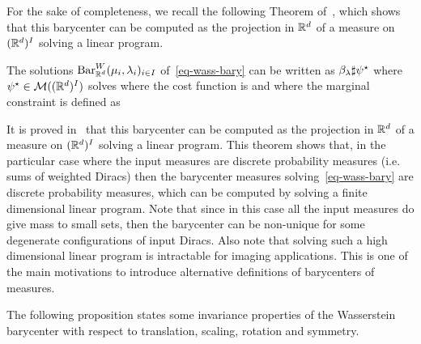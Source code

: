 
For the sake of completeness, we recall the following Theorem of~\cite{Carlier_wasserstein_barycenter}, which shows that this barycenter can be computed as the projection in $\mathbb{R}^d$ of a measure on $(\mathbb{R}^d)^I$ solving a linear program. 


\begin{thm}\label{thm-multimarginal-wass}
	The solutions $\text{\upshape Bar}_{\mathbb{R}^d}^W(\mu_i,\lambda_i)_{i \in I}$ of~\eqref{eq-wass-bary} can be written as $\beta_\lambda \sharp \psi^\star$ 
	where $\psi^\star \in \mathcal{M}( (\mathbb{R}^d)^I )$ solves
	where the cost function is 
	and where the marginal constraint is defined as
\end{thm}

\fi

It is proved in~\cite{Carlier_wasserstein_barycenter} that this barycenter can be computed as the projection in $\mathbb{R}^d$ of a measure on $(\mathbb{R}^d)^I$ solving a linear program. This theorem shows that, in the particular case where the input measures are discrete probability measures (i.e. sums of weighted Diracs) then the barycenter measures solving~\eqref{eq-wass-bary} are discrete probability measures, which can be computed by solving a finite dimensional linear program. Note that since in this case all the input measures do give mass to small sets, then the barycenter can be non-unique for some degenerate configurations of input Diracs. Also note that solving such a high dimensional linear program is intractable for imaging applications. This is one of the main motivations to introduce alternative definitions of barycenters of measures. 

The following proposition states some invariance properties of the Wasserstein barycenter with respect to translation, scaling, rotation and symmetry.

